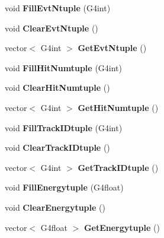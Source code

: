 \begin{DoxyCompactItemize}
void {\bfseries Fill\+Evt\+Ntuple} (G4int)
\item 
\hypertarget{class_run_action_a9a26dfb552e6b5eb17ae4db9990b57cb}{}\label{class_run_action_a9a26dfb552e6b5eb17ae4db9990b57cb} 
void {\bfseries Clear\+Evt\+Ntuple} ()
\item 
\hypertarget{class_run_action_adc94bc41aca38e605436ae9ccb717bd6}{}\label{class_run_action_adc94bc41aca38e605436ae9ccb717bd6} 
vector$<$ G4int $>$ {\bfseries Get\+Evt\+Ntuple} ()
\item 
\hypertarget{class_run_action_a0bbcb3e29c7fe08c5e1407d8b135c8aa}{}\label{class_run_action_a0bbcb3e29c7fe08c5e1407d8b135c8aa} 
void {\bfseries Fill\+Hit\+Numtuple} (G4int)
\item 
\hypertarget{class_run_action_ab82fce992aaf15634afc2646b5aae72a}{}\label{class_run_action_ab82fce992aaf15634afc2646b5aae72a} 
void {\bfseries Clear\+Hit\+Numtuple} ()
\item 
\hypertarget{class_run_action_a392891d707e3a91e5bfc04e3384612ef}{}\label{class_run_action_a392891d707e3a91e5bfc04e3384612ef} 
vector$<$ G4int $>$ {\bfseries Get\+Hit\+Numtuple} ()
\item 
\hypertarget{class_run_action_aa19b8463e3dade24da0746c759191934}{}\label{class_run_action_aa19b8463e3dade24da0746c759191934} 
void {\bfseries Fill\+Track\+I\+Dtuple} (G4int)
\item 
\hypertarget{class_run_action_a182b204e689e48859627a2c32550a8ef}{}\label{class_run_action_a182b204e689e48859627a2c32550a8ef} 
void {\bfseries Clear\+Track\+I\+Dtuple} ()
\item 
\hypertarget{class_run_action_a86882b695d5a6e70401ce70ab43983f0}{}\label{class_run_action_a86882b695d5a6e70401ce70ab43983f0} 
vector$<$ G4int $>$ {\bfseries Get\+Track\+I\+Dtuple} ()
\item 
\hypertarget{class_run_action_a8bb536a43b52b9a54cfdc9b9f121a9c7}{}\label{class_run_action_a8bb536a43b52b9a54cfdc9b9f121a9c7} 
void {\bfseries Fill\+Energytuple} (G4float)
\item 
\hypertarget{class_run_action_a3b07a6e87efdafdef1fd9a2e2904408f}{}\label{class_run_action_a3b07a6e87efdafdef1fd9a2e2904408f} 
void {\bfseries Clear\+Energytuple} ()
\item 
\hypertarget{class_run_action_a83f68e07fa5cd862dd0e14941fb75ee8}{}\label{class_run_action_a83f68e07fa5cd862dd0e14941fb75ee8} 
vector$<$ G4float $>$ {\bfseries Get\+Energytuple} ()
\item 
\hypertarget{class_run_action_a3d3f63384e0e3a3f56a49e94d1151697}{}\label{class_run_action_a3d3f63384e0e3a3f56a49e94d1151697} 

\end{DoxyCompactItemize}
